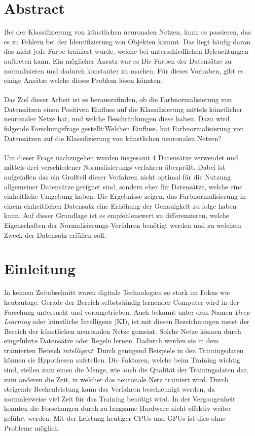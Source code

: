 \documentclass[a4paper,12pt,oneside]{article}
\begin{document}
  \section*{Abstract}
Bei der Klassifizierung von künstlichen neuronalen Netzen, kann es passieren, das es zu Fehlern bei der Identifizierung von Objekten kommt. Das liegt häufig daran das nicht jede Farbe trainiert wurde, welche bei unterschiedlichen Beleuchtungen auftreten kann. Ein möglicher Ansatz war es Die Farben der Datensätze zu normalisieren und dadurch konstanter zu machen. Für dieses Vorhaben, gibt es einige Ansätze welche dieses Problem lösen könnten.\\\\
Das Ziel dieser Arbeit ist es herauszufinden, ob die Farbnormalisierung von Datensätzen einen Positiven Einfluss auf die Klassifizierung mittels künstlicher neuronaler Netze hat, und welche Beschränkungen diese haben. Dazu wird folgende Forschungsfrage gestellt:Welchen Einfluss, hat Farbnormalisierung von Datensätzen
auf die Klassifizierung von künstlichen neuronalen Netzen? \\\\
Um dieser Frage nachzugehen wurden insgesamt 4 Datensätze verwendet und mittels drei verschiedener Normalisierungs-verfahren überprüft. Dabei ist aufgefallen das ein Großteil dieser Verfahren nicht optimal für die Nutzung allgemeiner Datensätze geeignet sind, sondern eher für Datensätze, welche eine einheitliche Umgebung haben. Die Ergebnisse zeigen, das Farbnormalisierung in einem einheitlichen Datensatz eine Erhöhung der Genauigkeit zu folge haben kann. Auf dieser Grundlage ist es empfehlenswert zu differenzieren, welche Eigenschaften der Normalisierungs-Verfahren benötigt werden und zu welchem Zweck der Datensatz erfüllen soll.
  \newpage
  \listoffigures
  \newpage
  \listoftables
  \newpage
  \tableofcontents
  \newpage
  \section{Einleitung}\label{s.einleitung} 
In keinem Zeitabschnitt waren digitale Technologien so stark im Fokus wie heutzutage. Gerade der Bereich selbstständig lernender Computer wird in der Forschung untersucht und vorangetrieben. Auch bekannt unter dem Namen \textit{Deep Learning} oder künstliche Intelligenz (KI), ist mit diesen Bezeichnungen meist der Bereich der künstlichen neuronalen Netze gemeint. Solche Netze können durch eingeführte Datensätze oder Regeln lernen. Dadurch werden sie in dem trainierten Bereich \textit{intelligent}. Durch genügend Beispiele in den Trainingsdaten können sie Hypothesen aufstellen. Die Faktoren, welche beim Training wichtig sind, stellen zum einen die Menge, wie auch die Qualität der Trainingsdaten dar, zum anderen die Zeit, in welcher das neuronale Netz trainiert wird. Durch steigende Rechenleistung kann das Verfahren beschleunigt werden, da normalerweise viel Zeit für das Training benötigt wird. In der Vergangenheit konnten die Forschungen durch zu langsame Hardware nicht effektiv weiter geführt werden. Mit der Leistung heutiger CPUs und GPUs ist dies ohne Probleme möglich.\\ 
\end{document}
